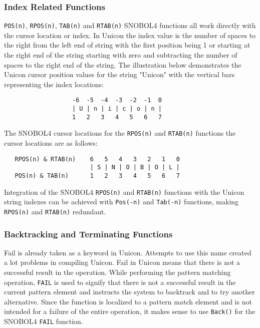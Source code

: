 \documentclass{article}
\begin{document}
\vspace{1 pc}
\subsubsection{Index Related Functions}
\texttt{POS(n)}, \texttt{RPOS(n)}, \texttt{TAB(n)} and \texttt{RTAB(n)} SNOBOL4 functions all work directly with the cursor location or index.  In Unicon the index value is the number of spaces to the right from the left end of string with the first position being 1 or starting at the right end of the string starting with zero and subtracting the number of spaces to the right end of the string.\cite{JefferyUnicon}   The illustration below demonstrates the Unicon cursor position values for the string "Unicon" with the vertical bars representing the index locations:

\begin{verbatim}
                   -6  -5  -4  -3  -2  -1  0
                   | U | n | i | c | o | n |
                   1   2   3   4   5   6   7
\end{verbatim}

The SNOBOL4 cursor locations for the \texttt{RPOS(n)} and \texttt{RTAB(n)} functions the cursor locations are as follows:

\begin{verbatim}
   RPOS(n) & RTAB(n)    6   5   4   3   2   1   0
                        | S | N | O | B | O | L |
   POS(n) & TAB(n)      1   2   3   4   5   6   7
\end{verbatim}

Integration of the SNOBOL4 \texttt{RPOS(n)} and \texttt{RTAB(n)} functions with the Unicon string indexes can be achieved with \texttt{Pos(-n)} and \texttt{Tab(-n)} functions, making \texttt{RPOS(n)} and \texttt{RTAB(n)} redundant.

\vspace{1 pc}
\subsubsection{Backtracking and Terminating Functions}
Fail is already taken as a keyword in Unicon.  Attempts to use this name created a lot problems in compiling Unicon.  Fail in Unicon means that there is not a successful result in the operation.  While performing the pattern matching operation, \texttt{FAIL} is used to signify that there is not a successful result in the current pattern element and instructs the system to backtrack and to try another alternative.  Since the function is localized to a pattern match element and is not intended for a failure of the entire operation, it makes sense to use \texttt{Back()} for the SNOBOL4 \texttt{FAIL} function.
\end{document}
